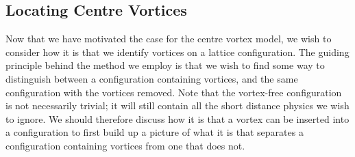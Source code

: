 \subsection{Locating Centre Vortices}\label{sec:LocatingVortices}
Now that we have motivated the case for the centre vortex model, we wish to consider how it is that we identify vortices on a lattice configuration. The guiding principle behind the method we employ is that we wish to find some way to distinguish between a configuration containing vortices, and the same configuration with the vortices removed. Note that the vortex-free configuration is not necessarily trivial; it will still contain all the short distance physics we wish to ignore. We should therefore discuss how it is that a vortex can be inserted into a configuration to first build up a picture of what it is that separates a configuration containing vortices from one that does not.\\

